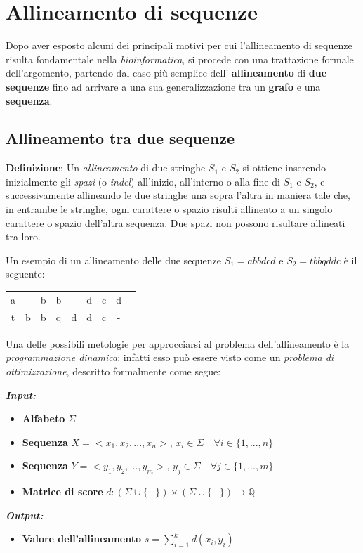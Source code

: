 \chapter{Allineamento di sequenze}
    Dopo aver esposto alcuni dei principali motivi per cui l'allineamento di sequenze risulta fondamentale nella \emph{bioinformatica}, si procede con una trattazione formale dell'argomento, partendo dal caso più semplice dell' \textbf{allineamento} di \textbf{due sequenze} fino ad arrivare a una sua generalizzazione tra un \textbf{grafo} e una \textbf{sequenza}. 
    
\section{Allineamento tra due sequenze}
    \textbf{Definizione}: Un \emph{allineamento} di due stringhe $S_1$ e $S_2$ si ottiene inserendo inizialmente gli \emph{spazi} (o \emph{indel}) all'inizio, all'interno o alla fine di $S_1$ e $S_2$, e successivamente allineando le due stringhe una sopra l'altra in maniera tale che, in entrambe le stringhe, ogni carattere o spazio risulti allineato a un singolo carattere o spazio dell'altra sequenza. Due spazi non possono risultare allineati tra loro. \cite{Gusfield}

    Un esempio di un allineamento delle due sequenze $S_1 = abbdcd$ e $S_2 = tbbqddc$ è il seguente:
    \vspace{20pt}
    \begin{table}[h]
        \centering
        \begin{tabular}{ccccccccc}
             a & - & b & b & - & d & c & d \\
             t & b & b & q & d & d & c & - \\
        \end{tabular}
    \end{table}
    \vspace{20pt}

    Una delle possibili metologie per approcciarsi al problema dell'allineamento è la \emph{programmazione dinamica}: infatti esso può essere visto come un \emph{problema di ottimizzazione}, descritto formalmente come segue:  
    
    \noindent
    \textbf{\textit{Input:}} 
    \begin{itemize}
        \item \textbf{Alfabeto} $\Sigma$
        \item \textbf{Sequenza} $X = <x_1, x_2, ..., x_n>, \, x_i \in \Sigma \quad \forall i \in \{1, ..., n\}$
        \item \textbf{Sequenza} $Y = <y_1, y_2, ..., y_m>, \, y_j \in \Sigma \quad \forall j \in \{1, ..., m\}$
        \item \textbf{Matrice di score} $d: (\Sigma \cup \{-\}) \times (\Sigma \cup \{-\}) \rightarrow \mathbb{Q}$
    \end{itemize}
    \textbf{\textit{Output:}} 
    \begin{itemize}
        \item \textbf{Valore dell'allineamento} $s = \sum_{i=1}^{k} d(x_i, y_i)$
    \end{itemize}

